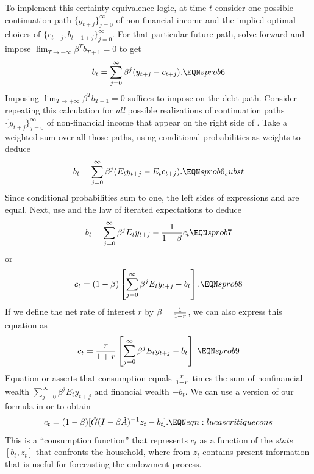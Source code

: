 To implement this certainty equivalence logic, at time $t$ consider one possible continuation path 
$\{y_{t+j}\}_{j=0}^\infty$ of non-financial income and the  implied 
optimal choices of $\{c_{t+j}, b_{t+1+j}\}_{j=0}^\infty$.
For that particular future path, 
solve  forward and impose $\lim_{T\rightarrow +\infty} \beta^T b_{T+1} =0$ to get
$$ b_t = \sum_{j=0}^\infty \beta^j (y_{t+j} - c_{t+j}) .  \EQN sprob6 $$
Imposing $\lim_{T\rightarrow +\infty} \beta^T b_{T+1} =0$ suffices to impose  on the debt path. Consider repeating this calculation 
 for {\it all\/} possible realizations of continuation paths $\{y_{t+j}\}_{j=0}^\infty$ of non-financial income that appear on the right side of .
 Take a weighted  sum 
over all those paths, using conditional probabilities as weights to deduce
$$ b_t = \sum_{j=0}^\infty \beta^j (E_t y_{t+j} - E_t c_{t+j}).   \EQN sprob6_subst $$
Since  conditional probabilities sum to one,   the left sides of  expressions
 and  are equal.
Next, use 
and the law of iterated expectations to deduce
$$ b_t = \sum_{j=0}^\infty \beta^j E_t y_{t+j} - {1 \over 1-\beta} c_t
\EQN sprob7 $$
 or
$$ c_t = (1-\beta)
\left[ \sum_{j=0}^\infty \beta^j E_t y_{t+j} - b_t\right].
 \EQN sprob8  $$
If we define the net rate of interest $r$ by $\beta ={1 \over 1+r}$, we can
also express this
equation as
$$ c_t = {r \over 1+r}
\left[ \sum_{j=0}^\infty \beta^j E_t y_{t+j} - b_t\right]. \EQN sprob9 $$
Equation  or  asserts that consumption  equals
 ${r \over 1+r}$ times
the sum of nonfinancial wealth $
\sum_{j=0}^\infty \beta^j E_t y_{t+j}$ and financial
wealth $-b_t$.   We can use a version of  our formula  in   or  to obtain
$$  c_t  = (1-\beta) [ \check G(I-\beta \check A)^{-1} z_t - b_t ]  .  \EQN eqn:lucascritiquecons $$
This is a ``consumption function'' that   represents
$c_t$  as a function of the {\it state\/} $[b_t, z_t]$ that
 confronts the household, where  from  $z_t$ contains present
information that is useful for forecasting the endowment process.







